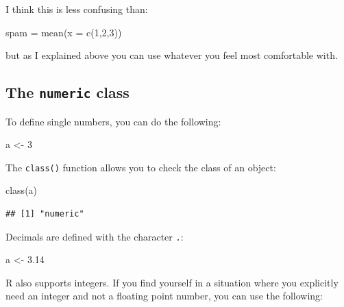 \documentclass[
]{article}
\newenvironment{Shaded}{\begin{snugshade}}{\end{snugshade}}
\newcommand{\AttributeTok}[1]{\textcolor[rgb]{0.77,0.63,0.00}{#1}}
\newcommand{\DecValTok}[1]{\textcolor[rgb]{0.00,0.00,0.81}{#1}}
\newcommand{\FloatTok}[1]{\textcolor[rgb]{0.00,0.00,0.81}{#1}}
\newcommand{\FunctionTok}[1]{\textcolor[rgb]{0.00,0.00,0.00}{#1}}
\newcommand{\NormalTok}[1]{#1}
\newcommand{\OtherTok}[1]{\textcolor[rgb]{0.56,0.35,0.01}{#1}}
\begin{document}
I think this is less confusing than:

\begin{Shaded}
\begin{Highlighting}[]
\NormalTok{spam }\OtherTok{=} \FunctionTok{mean}\NormalTok{(}\AttributeTok{x =} \FunctionTok{c}\NormalTok{(}\DecValTok{1}\NormalTok{,}\DecValTok{2}\NormalTok{,}\DecValTok{3}\NormalTok{))}
\end{Highlighting}
\end{Shaded}

but as I explained above you can use whatever you feel most comfortable with.

\hypertarget{the-numeric-class}{%
\subsection{\texorpdfstring{The \texttt{numeric} class}{The numeric class}}\label{the-numeric-class}}

To define single numbers, you can do the following:

\begin{Shaded}
\begin{Highlighting}[]
\NormalTok{a }\OtherTok{\textless{}{-}} \DecValTok{3}
\end{Highlighting}
\end{Shaded}

The \texttt{class()} function allows you to check the class of an object:

\begin{Shaded}
\begin{Highlighting}[]
\FunctionTok{class}\NormalTok{(a)}
\end{Highlighting}
\end{Shaded}

\begin{verbatim}
## [1] "numeric"
\end{verbatim}

Decimals are defined with the character \texttt{.}:

\begin{Shaded}
\begin{Highlighting}[]
\NormalTok{a }\OtherTok{\textless{}{-}} \FloatTok{3.14}
\end{Highlighting}
\end{Shaded}

R also supports integers. If you find yourself in a situation where you explicitly need an integer
and not a floating point number, you can use the following:
\end{document}
